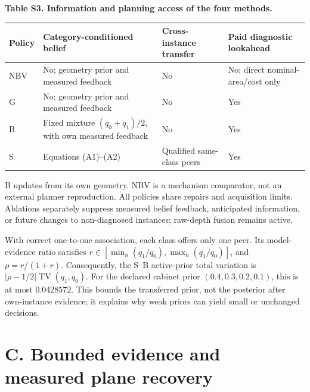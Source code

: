 \documentclass[11pt,a4paper]{article}
\newlength{\SupplementTableWidth}
\begin{document}
\par\noindent\begin{minipage}{\linewidth}
\small\textbf{Table S3. Information and planning access of the four methods.}\par\medskip
\centering
\setlength{\tabcolsep}{4pt}
\renewcommand{\arraystretch}{1.13}
\setlength{\SupplementTableWidth}{\dimexpr\linewidth-6\tabcolsep\relax}
\begin{tabular}{@{}>{\raggedright\arraybackslash}p{0.1\SupplementTableWidth} >{\raggedright\arraybackslash}p{0.4\SupplementTableWidth} >{\raggedright\arraybackslash}p{0.23\SupplementTableWidth} >{\raggedright\arraybackslash}p{0.27\SupplementTableWidth}@{}}
\toprule
Policy & Category-conditioned belief & Cross-instance transfer & Paid diagnostic lookahead \\
\midrule
NBV & No; geometry prior and measured feedback & No & No; direct nominal-area/cost only \\
G & No; geometry prior and measured feedback & No & Yes \\
B & Fixed mixture \((q_0+q_1)/2\), with own measured feedback & No & Yes \\
S & Equations (A1)--(A2) & Qualified same-class peers & Yes \\
\bottomrule
\end{tabular}
\end{minipage}\par\medskip

B updates from its own geometry. NBV is a mechanism comparator, not an external planner reproduction. All policies share repairs and acquisition limits. Ablations separately suppress measured belief feedback, anticipated information, or future changes to non-diagnosed instances; raw-depth fusion remains active.

With correct one-to-one association, each class offers only one peer. Its model-evidence ratio satisfies \(r\in[\min_h(q_1/q_0),\max_h(q_1/q_0)]\), and \(\rho=r/(1+r)\). Consequently, the S--B active-prior total variation is \(|\rho-1/2|\operatorname{TV}(q_1,q_0)\). For the declared cabinet prior \((0.4,0.3,0.2,0.1)\), this is at most \(0.0428572\). This bounds the transferred prior, not the posterior after own-instance evidence; it explains why weak priors can yield small or unchanged decisions.

\hypertarget{c.-bounded-evidence-and-measured-plane-recovery}{%
\section*{C. Bounded evidence and measured plane recovery}\label{c.-bounded-evidence-and-measured-plane-recovery}}
\end{document}
